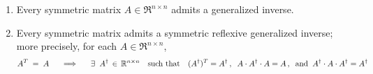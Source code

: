 \begin{proposition}
\label{SymmetricMatricesAdmitSymmetricReflexiveGeneralizedInverses}
\mbox{}\vskip -0.1cm\noindent
\begin{enumerate}
\item
	Every symmetric matrix $A \in \Re^{n \times n}$ admits a generalized inverse.
\item
	Every symmetric matrix admits a symmetric reflexive
	generalized inverse; more precisely, for each $A \in \Re^{n \times n}$,
	\begin{equation*}
	A^{T} \;=\; A
	\quad\;\;\Longrightarrow\quad\;\;
	\exists\;\;A^{\dagger} \,\in\, \Re^{n \times n}
	\quad\textnormal{such that}\quad
	(A^{\dagger})^{T} = A^{\dagger}\,,\;\;
	A \cdot A^{\dagger} \cdot A = A\,,\;\;
	\textnormal{and}\;\;
	A^{\dagger} \cdot A \cdot A^{\dagger} = A^{\dagger}
	\end{equation*}
\end{enumerate}
\end{proposition}
\proof
